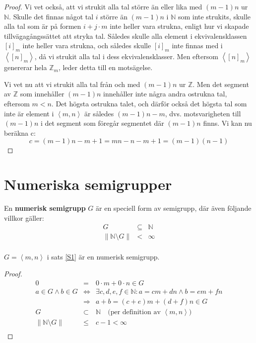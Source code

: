 \begin{proof}
Vi vet också, att vi strukit alla tal större än eller lika med $(m-1)n$ ur $\mathbb{N}$. Skulle det finnas något tal $i$ större än  $(m-1)n$ i $\mathbb{N}$ som inte strukits, skulle alla tal som är på formen $i+j\cdot m$ inte heller vara strukna, enligt hur vi skapade tillvägagångssättet att stryka tal. Således skulle alla element i ekvivalensklassen $[i]_m$ inte heller vara strukna, och således skulle $[i]_m$ inte finnas med i $\left<[n]_m\right>$, då vi strukit alla tal i dess ekvivalensklasser. Men eftersom $\left<[n]_m\right>$ genererar hela $\mathbb{Z}_m$, leder detta till en motsägelse.

Vi vet nu att vi strukit alla tal från och med $(m-1)n$ ur $\mathbb{Z}$. Men det segment av $\mathbb{Z}$ som innehåller $(m-1)n$ innehåller inte några andra ostrukna tal, eftersom $m < n$. Det högsta ostrukna talet, och därför också det högsta tal som inte är element i $\left<m, n\right>$ är således $(m - 1)n - m$, dvs. motsvarigheten till $(m - 1)n$ i det segment som föregår segmentet där $(m - 1)n$ finns. Vi kan nu beräkna c:
\[c = (m - 1)n - m + 1 = mn - n - m + 1 = (m - 1)(n - 1)\]
\end{proof}

\section{Numeriska semigrupper}

\begin{Definition}
En \textbf{numerisk semigrupp} $G$ är en speciell form av semigrupp, där även följande villkor gäller:
\[
\begin{array}{rcl}
G & \subseteq & \mathbb{N} \\
\left\| \mathbb{N} \setminus G \right\| & < & \infty \\
\end{array}\]
\end{Definition}

\begin{Lemma}
$G = \left<m, n\right>$ i sats \ref{S1} är en numerisk semigrupp.
\end{Lemma}

\begin{proof}
\[\begin{array}{rcl}
0 & = & 0 \cdot m + 0 \cdot n \in G \\
a \in G \wedge b \in G & \Longleftrightarrow & \exists c, d, e, f \in \mathbb{N} : a = cm + dn \wedge b = em + fn \\
 & \Longrightarrow & a + b = (c + e)m + (d + f)n \in G \\
G & \subset & \mathbb{N} \quad\text{(per definition av } \left<m, n\right> \text{)} \\
\left\|\mathbb{N}\setminus G\right\| & \leq & c - 1 < \infty \\
\end{array}\]
\end{proof}

